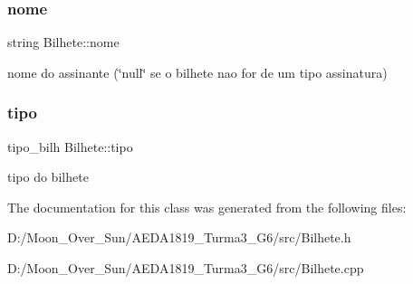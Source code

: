 \subsubsection{\texorpdfstring{nome}{nome}}
{\footnotesize\ttfamily string Bilhete\+::nome\hspace{0.3cm}{\ttfamily [protected]}}

nome do assinante (\char`\"{}null\char`\"{} se o bilhete nao for de um tipo assinatura) \mbox{\label{class_bilhete_a811d01c91c9ca7e43ca05b4de7cb053d}} 
\subsubsection{\texorpdfstring{tipo}{tipo}}
{\footnotesize\ttfamily tipo\+\_\+bilh Bilhete\+::tipo\hspace{0.3cm}{\ttfamily [protected]}}

tipo do bilhete 

The documentation for this class was generated from the following files\+:\begin{DoxyCompactItemize}
\item 
D\+:/\+Moon\+\_\+\+Over\+\_\+\+Sun/\+A\+E\+D\+A1819\+\_\+\+Turma3\+\_\+\+G6/src/Bilhete.\+h\item 
D\+:/\+Moon\+\_\+\+Over\+\_\+\+Sun/\+A\+E\+D\+A1819\+\_\+\+Turma3\+\_\+\+G6/src/Bilhete.\+cpp\end{DoxyCompactItemize}
